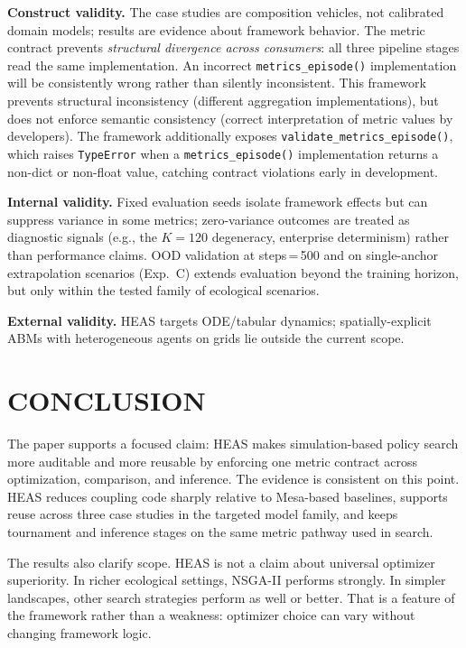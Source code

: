 \documentclass{wscpaperproc}
\begin{document}
\textbf{Construct validity.} The case studies are composition vehicles, not
calibrated domain models; results are evidence about framework behavior. The
metric contract prevents \emph{structural divergence across consumers}: all
three pipeline stages read the same implementation. An incorrect \texttt{metrics\_episode()}
implementation will be consistently wrong rather than silently inconsistent. This framework prevents structural inconsistency (different aggregation implementations), but does not enforce semantic consistency (correct interpretation of metric values by developers). The
framework additionally exposes \texttt{validate\_metrics\_episode()}, which raises
\texttt{TypeError} when a \texttt{metrics\_episode()} implementation returns a
non-dict or non-float value, catching contract violations early in development.

\textbf{Internal validity.} Fixed evaluation seeds isolate framework effects
but can suppress variance in some metrics; zero-variance outcomes are treated as
diagnostic signals (e.g., the $K\!=\!120$ degeneracy, enterprise determinism)
rather than performance claims. OOD validation at steps\,=\,500 and on
single-anchor extrapolation scenarios (Exp.~C) extends evaluation beyond the
training horizon, but only within the tested family of ecological scenarios.

\textbf{External validity.} HEAS targets ODE/tabular dynamics; spatially-explicit ABMs
with heterogeneous agents on grids lie outside the current scope.

\section{CONCLUSION}

The paper supports a focused claim: HEAS makes simulation-based policy search
more auditable and more reusable by enforcing one metric contract across
optimization, comparison, and inference. The evidence is consistent on this
point. HEAS reduces coupling code sharply relative to Mesa-based baselines,
supports reuse across three case studies in the targeted model family, and
keeps tournament and inference stages on the same metric pathway used in search.

The results also clarify scope. HEAS is not a claim about universal optimizer
superiority. In richer ecological settings, NSGA-II performs strongly. In
simpler landscapes, other search strategies perform as well or better. That is
a feature of the framework rather than a weakness: optimizer choice can vary
without changing framework logic.
\end{document}
